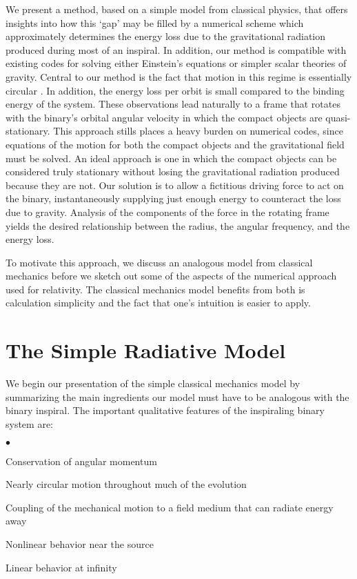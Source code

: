 We present a method, based on a simple model from classical 
physics, that offers insights into how this `gap' may be filled 
by a numerical scheme which approximately determines the energy 
loss due to the gravitational radiation produced during most of 
an inspiral.
In addition, our method is compatible with existing codes for solving
either Einstein's equations or simpler scalar theories of gravity.
Central to our method is the fact that motion in this regime is 
essentially circular \cite{peters63,peters64}.
In addition, the energy loss per orbit is small compared to the 
binding energy of the system.  
These observations lead naturally to a frame that rotates with the 
binary's orbital angular velocity in which the compact objects 
are quasi-stationary.  
This approach stills places a heavy burden on numerical codes, 
since equations of the motion for both the compact objects and 
the gravitational field must be solved.  
An ideal approach is one in which the compact objects can be 
considered truly stationary without losing the gravitational 
radiation produced because they are not.
Our solution is to allow a fictitious driving force to act on the 
binary, instantaneously supplying just enough energy to counteract 
the loss due to gravity.
Analysis of the components of the force in the rotating frame 
yields the desired relationship between the radius, the angular 
frequency, and the energy loss.  

To motivate this approach, we discuss an analogous model from 
classical mechanics before we sketch out some of the aspects of 
the numerical approach used for relativity.  
The classical mechanics model benefits from both is calculation 
simplicity and the fact that one's intuition is easier to apply.

\section{The Simple Radiative Model}

We begin our presentation of the simple classical mechanics model 
by summarizing the main ingredients our model must have to be 
analogous with the binary inspiral.
The important qualitative features of the inspiraling binary 
system are:

\begin{list}
   {$\bullet$}{
    \setlength{\rightmargin}{\leftmargin}}
	\item Conservation of angular momentum 
 	\item Nearly circular motion throughout much of the evolution
	\item Coupling of the mechanical motion to a field medium that can radiate 
	      energy away
	\item Nonlinear behavior near the source
	\item Linear behavior at infinity
\end{list}

